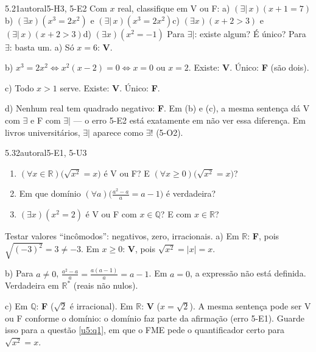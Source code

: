 \begin{exemplo}{5.2}{1}{autoral}{5-H3, 5-E2}\label{ex:5.2}
Com $x$ real, classifique em V ou F:\quad
a) $(\exists|\,x)(x+1=7)$\quad b) $(\exists x)(x^3=2x^2)$ e $(\exists|\,x)(x^3=2x^2)$\quad c) $(\exists x)(x+2>3)$ e $(\exists|\,x)(x+2>3)$\quad d) $(\exists x)(x^2=-1)$
\plano Para $\exists|$: existe algum? É único? Para $\exists$: basta um.
\resolucao
a) Só $x=6$: \textbf{V}.
\par b) $x^3=2x^2\Leftrightarrow x^2(x-2)=0\Leftrightarrow x=0$ ou $x=2$. Existe: \textbf{V}. Único: \textbf{F} (são dois).
\par c) Todo $x>1$ serve. Existe: \textbf{V}. Único: \textbf{F}.
\par d) Nenhum real tem quadrado negativo: \textbf{F}.
\comentario Em (b) e (c), a mesma sentença dá V com $\exists$ e F com $\exists|$ — o erro 5-E2 está exatamente em não ver essa diferença. Em livros universitários, $\exists|$ aparece como $\exists!$ (5-O2).
\end{exemplo}

\begin{exemplo}{5.3}{2}{autoral}{5-E1, 5-U3}\label{ex:5.3}
\begin{enumerate}[label=\alph*)]
  \item $(\forall x\in\mathbb{R})\big(\sqrt{x^2}=x\big)$ é V ou F? E $(\forall x\ge0)\big(\sqrt{x^2}=x\big)$?
  \item Em que domínio $(\forall a)\big(\frac{a^2-a}{a}=a-1\big)$ é verdadeira?
  \item $(\exists x)(x^2=2)$ é V ou F com $x\in\mathbb{Q}$? E com $x\in\mathbb{R}$?
\end{enumerate}
\plano Testar valores \enquote{incômodos}: negativos, zero, irracionais.
\resolucao
a) Em $\mathbb{R}$: \textbf{F}, pois $\sqrt{(-3)^2}=3\neq-3$. Em $x\ge0$: \textbf{V}, pois $\sqrt{x^2}=|x|=x$.
\par b) Para $a\neq0$, $\frac{a^2-a}{a}=\frac{a(a-1)}{a}=a-1$. Em $a=0$, a expressão não está definida. Verdadeira em $\mathbb{R}^*$ (reais não nulos).
\par c) Em $\mathbb{Q}$: \textbf{F} ($\sqrt2$ é irracional). Em $\mathbb{R}$: \textbf{V} ($x=\sqrt2$).
\comentario A mesma sentença pode ser V ou F conforme o domínio: o domínio faz parte da afirmação (erro 5-E1). Guarde isso para a questão \ref{u5:q1}, em que o FME pede o quantificador certo para $\sqrt{x^2}=x$.
\end{exemplo}

